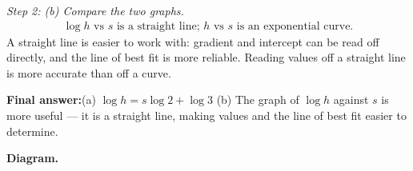 \documentclass[11pt]{article}
\begin{document}
\textit{Step 2: (b) Compare the two graphs.}
\[\begin{gathered}
\log h \text{ vs } s \text{ is a straight line; } h \text{ vs } s \text{ is an exponential curve.}
\end{gathered}\]
A straight line is easier to work with: gradient and intercept can be read off directly, and the line of best fit is more reliable. Reading values off a straight line is more accurate than off a curve.

\begin{answerbox}
\textbf{Final answer:}\quad (a) \(\displaystyle  \log h = s\log 2 + \log 3 \) \quad  (b) The graph of \(\displaystyle  \log h \) against \(\displaystyle  s \) is more useful --- it is a straight line, making values and the line of best fit easier to determine.
\end{answerbox}
\textbf{Diagram.}
\end{document}
